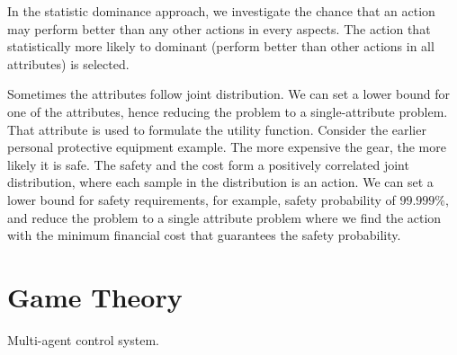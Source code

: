 In the statistic dominance approach, we investigate the chance that an action may perform better than any other actions in every aspects. The action that statistically more likely to dominant (perform better than other actions in all attributes) is selected.

Sometimes the attributes follow joint distribution. We can set a lower bound for one of the attributes, hence reducing the problem to a single-attribute problem. That attribute is used to formulate the utility function. Consider the earlier personal protective equipment example. The more expensive the gear, the more likely it is safe. The safety and the cost form a positively correlated joint distribution, where each sample in the distribution is an action. We can set a lower bound for safety requirements, for example, safety probability of $99.999\%$, and reduce the problem to a single attribute problem where we find the action with the minimum financial cost that guarantees the safety probability.

\section{Game Theory}

Multi-agent control system. 